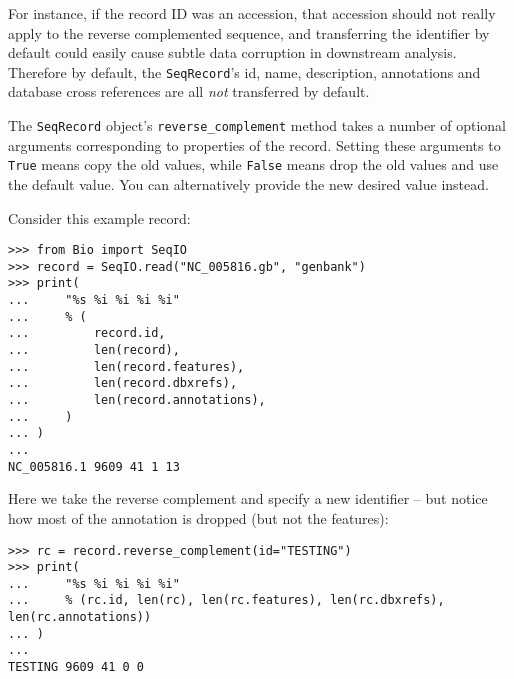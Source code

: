 For instance, if the record ID was an accession, that accession should not really
apply to the reverse complemented sequence, and transferring the identifier by
default could easily cause subtle data corruption in downstream analysis.
Therefore by default, the \verb|SeqRecord|'s id, name, description, annotations
and database cross references are all \emph{not} transferred by default.

The \verb|SeqRecord| object's \verb|reverse_complement| method takes a number
of optional arguments corresponding to properties of the record. Setting these
arguments to \verb|True| means copy the old values, while \verb|False| means
drop the old values and use the default value. You can alternatively provide
the new desired value instead.

Consider this example record:

\begin{verbatim}
>>> from Bio import SeqIO
>>> record = SeqIO.read("NC_005816.gb", "genbank")
>>> print(
...     "%s %i %i %i %i"
...     % (
...         record.id,
...         len(record),
...         len(record.features),
...         len(record.dbxrefs),
...         len(record.annotations),
...     )
... )
...
NC_005816.1 9609 41 1 13
\end{verbatim}

Here we take the reverse complement and specify a new identifier -- but notice
how most of the annotation is dropped (but not the features):

\begin{verbatim}
>>> rc = record.reverse_complement(id="TESTING")
>>> print(
...     "%s %i %i %i %i"
...     % (rc.id, len(rc), len(rc.features), len(rc.dbxrefs), len(rc.annotations))
... )
...
TESTING 9609 41 0 0
\end{verbatim}
